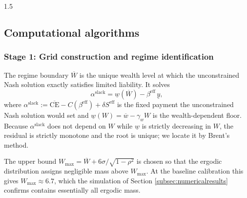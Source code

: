 \documentclass[12pt]{article}
\theoremstyle{definition}
\theoremstyle{plain}
\begin{document}
\begin{spacing}{1.5}
\subsection{Computational algorithms}\label{subsec:algorithms}
 
\subsubsection*{Stage 1: Grid construction and regime identification}
 
The regime boundary $\overline{W}$ is the unique wealth level at which the unconstrained Nash solution exactly satisfies limited liability. It solves
\[
\alpha^{\mathrm{slack}} = \underline{w}(\overline{W}) - \beta^{\mathrm{eff}}\,\underline{y},
\]
where $\alpha^{\mathrm{slack}} := \overline{\text{CE}} - C(\beta^{\mathrm{eff}}) + \delta S^{\mathrm{eff}}$ is the fixed payment the unconstrained Nash solution would set and $\underline{w}(W) = \overline{w} - \gamma_{w}W$ is the wealth-dependent floor. Because $\alpha^{\mathrm{slack}}$ does not depend on $W$ while $\underline{w}$ is strictly decreasing in $W$, the residual is strictly monotone and the root is unique; we locate it by Brent's method.

The upper bound $W_{\max} = \overline{W} + 6\sigma/\!\sqrt{1-\rho^{2}}$ is chosen so that the ergodic distribution assigns negligible mass above $W_{\max}$. At the baseline calibration this gives $W_{\max} \approx 6.7$, which the simulation of Section \ref{subsec:numericalresults} confirms contains essentially all ergodic mass.
 

\end{spacing}
\end{document}

